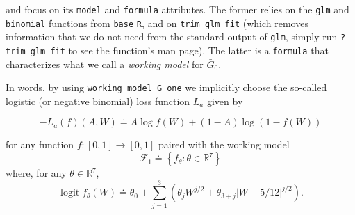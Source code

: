 \documentclass[
  11pt,
  openright,twoside]{book}
\newenvironment{Shaded}{\begin{snugshade}}{\end{snugshade}}
\newcommand{\CommentTok}[1]{\textcolor[rgb]{0.56,0.35,0.01}{\textit{#1}}}
\newcommand{\NormalTok}[1]{#1}
\DeclareMathOperator{\logit}{logit}
\newcommand{\bbR}{\mathbb{R}}
\newcommand{\defq}{\doteq}
\newcommand{\calF}{\mathcal{F}}
\newcommand{\Gbar}{\bar{G}}
\theoremstyle{definition}
\theoremstyle{definition}
\theoremstyle{definition}
\theoremstyle{definition}
\theoremstyle{remark}
\begin{document}
\begin{Shaded}
\end{Shaded}

and focus on its \texttt{model} and \texttt{formula} attributes. The former relies on the
\texttt{glm} and \texttt{binomial} functions from \texttt{base} \texttt{R}, and on \texttt{trim\_glm\_fit} (which
removes information that we do not need from the standard output of \texttt{glm},
simply run \texttt{?trim\_glm\_fit} to see the function's man page). The latter is a
\texttt{formula} that characterizes what we call a \emph{working model} for \(\Gbar_{0}\).

In words, by using \texttt{working\_model\_G\_one} we implicitly choose the so-called
logistic (or negative binomial) loss function \(L_{a}\) given by

\begin{equation} 
\label{eq:logis-loss} -L_{a}(f)(A,W) \defq A \log f(W) + (1 - A)
\log (1 - f(W)) 
\end{equation}

for any function \(f : [0,1] \to [0,1]\) paired with the working model
\begin{equation*}   \calF_{1}   \defq    \left\{f_{\theta}   :   \theta   \in
\bbR^{7}\right\}  \end{equation*} where, for any \(\theta \in \bbR^{7}\),
\begin{equation*}\logit  f_{\theta}  (W)  \defq \theta_{0}  +  \sum_{j=1}^{3}
\left(\theta_{j} W^{j/2} + \theta_{3+j} |W - 5/12|^{j/2}\right).\end{equation*}
\end{document}
